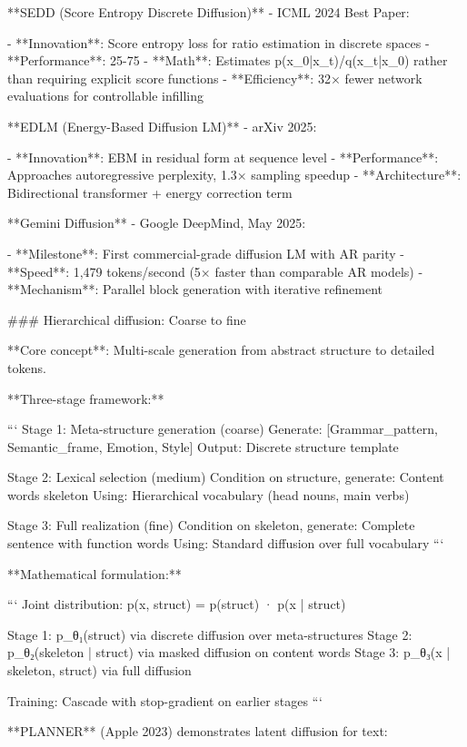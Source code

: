 \documentclass[11pt]{article}
\begin{document}
**SEDD (Score Entropy Discrete Diffusion)** - ICML 2024 Best Paper:

- **Innovation**: Score entropy loss for ratio estimation in discrete spaces
- **Performance**: 25-75%
- **Math**: Estimates p(x_0|x_t)/q(x_t|x_0) rather than requiring explicit score functions
- **Efficiency**: 32× fewer network evaluations for controllable infilling

**EDLM (Energy-Based Diffusion LM)** - arXiv 2025:

- **Innovation**: EBM in residual form at sequence level
- **Performance**: Approaches autoregressive perplexity, 1.3× sampling speedup
- **Architecture**: Bidirectional transformer + energy correction term

**Gemini Diffusion** - Google DeepMind, May 2025:

- **Milestone**: First commercial-grade diffusion LM with AR parity
- **Speed**: 1,479 tokens/second (5× faster than comparable AR models)
- **Mechanism**: Parallel block generation with iterative refinement

### Hierarchical diffusion: Coarse to fine

**Core concept**: Multi-scale generation from abstract structure to detailed tokens.

**Three-stage framework:**

```
Stage 1: Meta-structure generation (coarse)
Generate: [Grammar_pattern, Semantic_frame, Emotion, Style]
Output: Discrete structure template

Stage 2: Lexical selection (medium)  
Condition on structure, generate: Content words skeleton
Using: Hierarchical vocabulary (head nouns, main verbs)

Stage 3: Full realization (fine)
Condition on skeleton, generate: Complete sentence with function words
Using: Standard diffusion over full vocabulary
```

**Mathematical formulation:**

```
Joint distribution:
p(x, struct) = p(struct) · p(x | struct)

Stage 1: p_θ₁(struct) via discrete diffusion over meta-structures
Stage 2: p_θ₂(skeleton | struct) via masked diffusion on content words
Stage 3: p_θ₃(x | skeleton, struct) via full diffusion

Training: Cascade with stop-gradient on earlier stages
```

**PLANNER** (Apple 2023) demonstrates latent diffusion for text:
\end{document}
